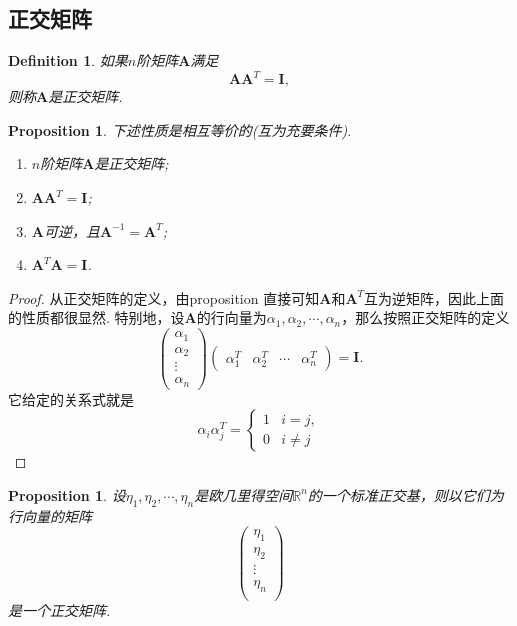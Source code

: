 \documentclass{article}
\newtheorem{proposition}[theorem]{Proposition}
\newtheorem{definition}[theorem]{Definition}
\newcommand{\mbf}[1]{\bm{#1}}
\begin{document}
\subsection{正交矩阵}

\begin{definition}
\rm 如果$n$阶矩阵$\mbf{A}$满足
$$
\mbf{A}\mbf{A}^T = \mbf{I},
$$
则称$\mbf{A}$是正交矩阵. 
\end{definition}

\begin{proposition}
\rm 下述性质是相互等价的(互为充要条件).
\begin{enumerate}
	\item $n$阶矩阵$\mbf{A}$是正交矩阵;
	\item $\mbf{A}\mbf{A}^T = \mbf{I}$;
	\item $\mbf{A}$可逆，且$\mbf{A}^{-1} = \mbf{A}^T$;
	\item $\mbf{A}^T\mbf{A} = \mbf{I}$. 
\end{enumerate}
\end{proposition}

\begin{proof}
从正交矩阵的定义，由proposition \label{invertible: prop1}直接可知$\mbf{A}$和$\mbf{A}^T$互为逆矩阵，因此上面的性质都很显然. 特别地，设$\mbf{A}$的行向量为$\alpha_1,\alpha_2,\cdots,\alpha_n$，那么按照正交矩阵的定义
$$
\begin{pmatrix}
\alpha_1 \\
\alpha_2 \\
\vdots \\
\alpha_n 
\end{pmatrix}
\begin{pmatrix}
\alpha_1^T & \alpha_2^T & \cdots & \alpha_n^T
\end{pmatrix} = \mbf{I}.
$$
它给定的关系式就是
$$
\alpha_i\alpha_j^T = \left\{ 
\begin{array}{ll}
1 & i=j,\\
0 & i\neq j
\end{array}
\right.
$$
\end{proof}

\begin{proposition}\label{orthogonal-matrix: basis}
\rm 设$\eta_1,\eta_2,\cdots,\eta_n$是欧几里得空间$\mathbb{R}^n$的一个标准正交基，则以它们为行向量的矩阵
$$
\begin{pmatrix}
\eta_1 \\
\eta_2 \\
\vdots \\
\eta_n \\
\end{pmatrix}
$$
是一个正交矩阵.
\end{proposition}
\end{document}
